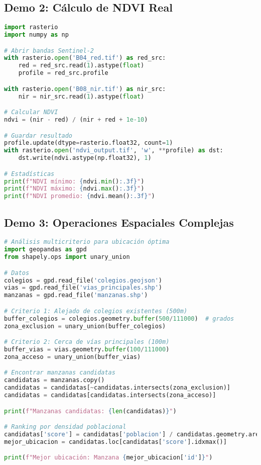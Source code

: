\documentclass[11pt,a4paper]{article}
\begin{document}
\subsection{Demo 2: Cálculo de NDVI Real}

\begin{lstlisting}[language=Python]
import rasterio
import numpy as np

# Abrir bandas Sentinel-2
with rasterio.open('B04_red.tif') as red_src:
    red = red_src.read(1).astype(float)
    profile = red_src.profile

with rasterio.open('B08_nir.tif') as nir_src:
    nir = nir_src.read(1).astype(float)

# Calcular NDVI
ndvi = (nir - red) / (nir + red + 1e-10)

# Guardar resultado
profile.update(dtype=rasterio.float32, count=1)
with rasterio.open('ndvi_output.tif', 'w', **profile) as dst:
    dst.write(ndvi.astype(np.float32), 1)

# Estadísticas
print(f"NDVI mínimo: {ndvi.min():.3f}")
print(f"NDVI máximo: {ndvi.max():.3f}")
print(f"NDVI promedio: {ndvi.mean():.3f}")
\end{lstlisting}

\subsection{Demo 3: Operaciones Espaciales Complejas}

\begin{lstlisting}[language=Python]
# Análisis multicriterio para ubicación óptima
import geopandas as gpd
from shapely.ops import unary_union

# Datos
colegios = gpd.read_file('colegios.geojson')
vias = gpd.read_file('vias_principales.shp')
manzanas = gpd.read_file('manzanas.shp')

# Criterio 1: Alejado de colegios existentes (500m)
buffer_colegios = colegios.geometry.buffer(500/111000)  # grados
zona_exclusion = unary_union(buffer_colegios)

# Criterio 2: Cerca de vías principales (100m)
buffer_vias = vias.geometry.buffer(100/111000)
zona_acceso = unary_union(buffer_vias)

# Encontrar manzanas candidatas
candidatas = manzanas.copy()
candidatas = candidatas[~candidatas.intersects(zona_exclusion)]
candidatas = candidatas[candidatas.intersects(zona_acceso)]

print(f"Manzanas candidatas: {len(candidatas)}")

# Ranking por densidad poblacional
candidatas['score'] = candidatas['poblacion'] / candidatas.geometry.area
mejor_ubicacion = candidatas.loc[candidatas['score'].idxmax()]

print(f"Mejor ubicación: Manzana {mejor_ubicacion['id']}")
\end{lstlisting}
\end{document}
